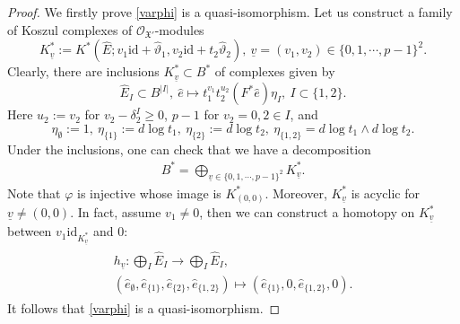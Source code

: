 \documentclass[12pt, a4paper]{article}
\begin{document}
\begin{proof}
We firstly prove \eqref{varphi} is a quasi-isomorphism. Let us construct a family of Koszul complexes of $\mathcal O_{\mathfrak X'}$-modules
$$
K^*_{\underline v}:=K^*(\hat E;v_1\mathrm{id}+\hat\vartheta_1,v_2\mathrm{id}+t_2\hat\vartheta_2),~\underline v=(v_1,v_2)\in\{0,1,\cdots,p-1\}^2.
$$
Clearly, there are inclusions $K^*_{\underline v}\subset B^*$ of complexes given by 
$$
\hat E_I\subset B^{|I|},~\hat e\mapsto t_1^{v_1}t_2^{u_2}(F^*\hat e)\eta_I,~I\subset\{1,2\}.
$$
Here $u_2:=v_2$ for $v_2-\delta_2^I\geq0$, $p-1$ for $v_2=0,2\in I$, and
$$\eta_\emptyset:=1,~\eta_{\{1\}}:=d\log t_1,~\eta_{\{2\}}:=d\log t_2,~\eta_{\{1,2\}}=d\log t_1\wedge d\log t_2.
$$
Under the inclusions, one can check that we have a decomposition
\begin{eqnarray}\label{decomposition}
B^*=\bigoplus_{\underline v\in\{0,1,\cdots,p-1\}^2}K^*_{\underline v}.
\end{eqnarray}
Note that $\varphi$ is injective whose image is $K^*_{(0,0)}$. Moreover, $K^*_{\underline v}$ is acyclic for $\underline v\neq(0,0)$. In fact, assume $v_1\neq0$, then we can construct a homotopy on $K^*_{\underline v}$ between $v_1\mathrm{id}_{K^*_{\underline v}}$ and $0$:
\begin{eqnarray}\label{homotopy}
\begin{array}{c}
h_{\underline v}:\bigoplus_I\hat E_I\to\bigoplus_I\hat E_I,\\
(\hat e_\emptyset,\hat e_{\{1\}},\hat e_{\{2\}},\hat e_{\{1,2\}})\mapsto (\hat e_{\{1\}},0,\hat e_{\{1,2\}},0).
\end{array}
\end{eqnarray}
It follows that \eqref{varphi} is a quasi-isomorphism.


\end{proof}
\end{document}
